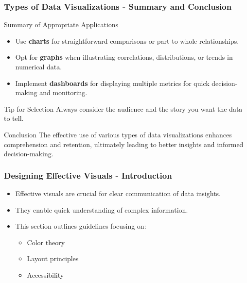 \documentclass{beamer}
\begin{document}
\begin{frame}[fragile]
    \frametitle{Types of Data Visualizations - Summary and Conclusion}
    \begin{block}{Summary of Appropriate Applications}
        \begin{itemize}
            \item Use \textbf{charts} for straightforward comparisons or part-to-whole relationships.
            \item Opt for \textbf{graphs} when illustrating correlations, distributions, or trends in numerical data.
            \item Implement \textbf{dashboards} for displaying multiple metrics for quick decision-making and monitoring.
        \end{itemize}
    \end{block}
    
    \begin{block}{Tip for Selection}
        Always consider the audience and the story you want the data to tell.
    \end{block}

    \begin{block}{Conclusion}
        The effective use of various types of data visualizations enhances comprehension and retention, ultimately leading to better insights and informed decision-making. 
    \end{block}
\end{frame}

\begin{frame}[fragile]
    \frametitle{Designing Effective Visuals - Introduction}
    \begin{itemize}
        \item Effective visuals are crucial for clear communication of data insights.
        \item They enable quick understanding of complex information.
        \item This section outlines guidelines focusing on:
        \begin{itemize}
            \item Color theory
            \item Layout principles
            \item Accessibility
        \end{itemize}
    \end{itemize}
\end{frame}
\end{document}
